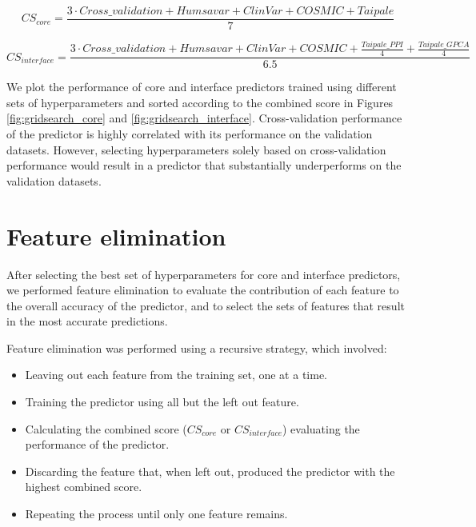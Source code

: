 \begin{equation} \label{eq:combined_score_core}
    CS_{core} = \frac{3 \cdot Cross\_validation + Humsavar + ClinVar + COSMIC + Taipale}{7}
\end{equation}

\begin{equation} \label{eq:combined_score_interface}
    CS_{interface} = \frac{3 \cdot Cross\_validation + Humsavar + ClinVar + COSMIC + \frac{Taipale\_{PPI}}{4} + \frac{Taipale\_{GPCA}}{4}}{6.5}
\end{equation}

We plot the performance of core and interface predictors trained using different sets of hyperparameters and sorted according to the combined score in Figures \ref{fig:gridsearch_core} and \ref{fig:gridsearch_interface}. Cross-validation performance of the predictor is highly correlated with its performance on the validation datasets. However, selecting hyperparameters solely based on cross-validation performance would result in a predictor that substantially underperforms on the validation datasets.

\clearpage



\clearpage
\section{Feature elimination} \label{sec:feature_elimination}

After selecting the best set of hyperparameters for core and interface predictors, we performed feature elimination to evaluate the contribution of each feature to the overall accuracy of the predictor, and to select the sets of features that result in the most accurate predictions.

Feature elimination was performed using a recursive strategy, which involved:

\vspace{-\topsep}
\begin{itemize}
	\itemsep0em
	\item Leaving out each feature from the training set, one at a time.
	\item Training the predictor using all but the left out feature.
	\item Calculating the combined score ($CS_{core}$ or $CS_{interface}$) evaluating the performance of the predictor.
	\item Discarding the feature that, when left out, produced the predictor with the highest combined score.
	\item Repeating the process until only one feature remains.
\end{itemize}

